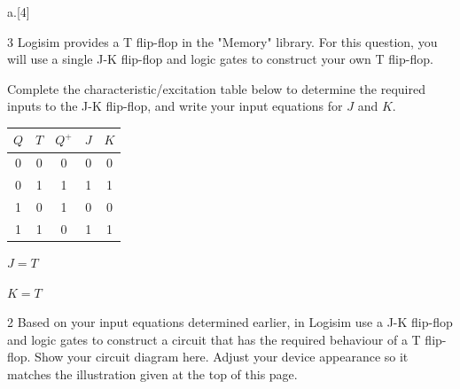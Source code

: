 \begin{question}{a.}[4]

\item[3] Logisim provides a T flip-flop in the "Memory" library. For this question, you will use a single J-K flip-flop and logic gates to construct your own T flip-flop.

Complete the characteristic/excitation table below to determine the required inputs to the J-K flip-flop, and write your input equations for $J$ and $K$.
\\
{\color{NavyBlue}
\begin{tabular}{c c | c | c c}
$Q$ & $T$ & $Q^{+}$ & $J$ & $K$ \\
\hline
0 & 0 & 0 & 0  & 0  \\
0 & 1 & 1 & 1  & 1  \\
1 & 0 & 1 & 0  & 0  \\
1 & 1 & 0 & 1  & 1  \\
\end{tabular}

$J = T $

$K = T $
}

\item[2] \label{q-tff} Based on your input equations determined earlier, in Logisim use a J-K flip-flop and logic gates to construct a circuit that has the required behaviour of a T flip-flop. Show your circuit diagram here. Adjust your device appearance so it matches the illustration given at the top of this page.


\end{question}
